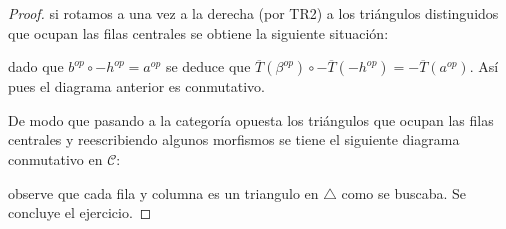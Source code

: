 \documentclass{article}
\newcommand{\cc}{\mathscr{C}}
\begin{document}
\begin{enumerate}
\begin{proof}
si rotamos a una vez a la derecha (por TR2) a los triángulos distinguidos que ocupan las filas centrales se obtiene la siguiente situaci\'on:

\begin{center}
\end{center}

dado que $b^{op}\circ -h^{op}=a^{op}$ se deduce que $\overline{T}(\beta^{op})\circ -\overline{T}(-h^{op})=-\overline{T}(a^{op})$. As\'i pues el diagrama anterior es conmutativo.

\bigskip

De modo que pasando a la categoría opuesta los triángulos que ocupan las filas centrales y reescribiendo algunos morfismos se tiene el siguiente diagrama conmutativo en $\cc$:

\begin{center}
\end{center}

observe que cada fila y columna es un triangulo en $\triangle$ como se buscaba. Se concluye el ejercicio.
\end{proof}






















\end{enumerate}		
\end{document}
